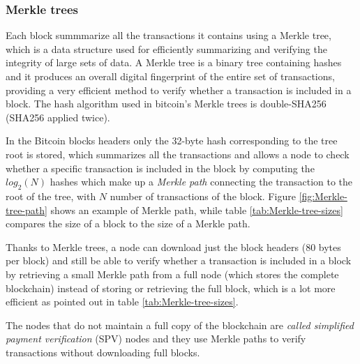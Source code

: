 \subsubsection{Merkle trees}\label{sec:Merkle-trees} Each block summmarize all the transactions it
contains using a Merkle tree, which is a data structure used for efficiently
summarizing and verifying the integrity of large sets of data. A Merkle tree  is
a binary tree containing hashes and it produces an overall digital fingerprint
of the entire set of transactions, providing a very efficient method to verify
whether a transaction is included in a block. The hash algorithm used in
bitcoin’s Merkle trees is double-SHA256 (SHA256 applied twice).

In the Bitcoin blocks headers only the 32-byte hash corresponding to the tree
root is stored, which summarizes all the transactions and allows a node to check
whether a specific transaction is included in the block by computing the
$log_2(N)$ hashes which make up a \emph{Merkle path} connecting the transaction
to the root of the tree, with $N$ number of transactions of the block. Figure
\ref{fig:Merkle-tree-path} shows an example of Merkle path, while table
\ref{tab:Merkle-tree-sizes} compares the size of a block to the size of a Merkle
path.

 Thanks to Merkle trees, a node can download just the block headers (80 bytes
 per block) and still be able to verify whether a transaction is included in a
 block by retrieving a small Merkle path from a full node (which stores the
 complete blockchain) instead of storing or retrieving the full block, which is
 a lot more efficient as pointed out in table \ref{tab:Merkle-tree-sizes}.

 The nodes that do not maintain a full copy of the blockchain are \emph{called
 simplified payment verification} (SPV) nodes and they use Merkle paths to
 verify transactions without downloading full blocks.

 \begin{table}[h!]
 \footnotesize

 \centering
 \caption{Merkle tree efficiency}
 \label{tab:Merkle-tree-sizes}
 \end{table}


